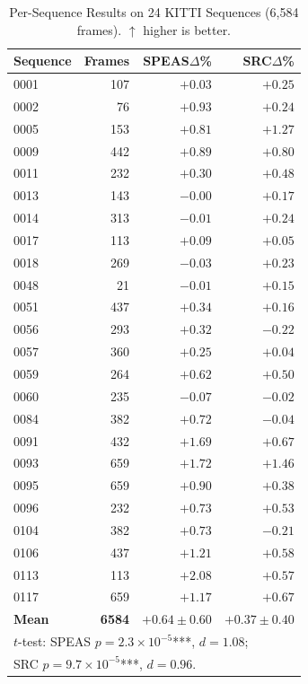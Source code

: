\documentclass[conference]{IEEEtran}
\begin{document}
\begin{table}[t]
\centering
\caption{Per-Sequence Results on 24 KITTI Sequences
(6{,}584 frames). $\uparrow$ higher is better.}
\label{tab:main}
\setlength{\tabcolsep}{4pt}
\begin{tabular}{lrrr}
\toprule
Sequence & Frames & SPEAS$\Delta$\% & SRC$\Delta$\% \\
\midrule
0001 &  107 & $+0.03$ & $+0.25$ \\
0002 &   76 & $+0.93$ & $+0.24$ \\
0005 &  153 & $+0.81$ & $+1.27$ \\
0009 &  442 & $+0.89$ & $+0.80$ \\
0011 &  232 & $+0.30$ & $+0.48$ \\
0013 &  143 & $-0.00$ & $+0.17$ \\
0014 &  313 & $-0.01$ & $+0.24$ \\
0017 &  113 & $+0.09$ & $+0.05$ \\
0018 &  269 & $-0.03$ & $+0.23$ \\
0048 &   21 & $-0.01$ & $+0.15$ \\
0051 &  437 & $+0.34$ & $+0.16$ \\
0056 &  293 & $+0.32$ & $-0.22$ \\
0057 &  360 & $+0.25$ & $+0.04$ \\
0059 &  264 & $+0.62$ & $+0.50$ \\
0060 &  235 & $-0.07$ & $-0.02$ \\
0084 &  382 & $+0.72$ & $-0.04$ \\
0091 &  432 & $+1.69$ & $+0.67$ \\
0093 &  659 & $+1.72$ & $+1.46$ \\
0095 &  659 & $+0.90$ & $+0.38$ \\
0096 &  232 & $+0.73$ & $+0.53$ \\
0104 &  382 & $+0.73$ & $-0.21$ \\
0106 &  437 & $+1.21$ & $+0.58$ \\
0113 &  113 & $+2.08$ & $+0.57$ \\
0117 &  659 & $+1.17$ & $+0.67$ \\
\midrule
\textbf{Mean} & \textbf{6584} &
  $\mathbf{+0.64{\pm}0.60}$ & $\mathbf{+0.37{\pm}0.40}$ \\
\bottomrule
\multicolumn{4}{l}{\footnotesize $t$-test: SPEAS
  $p{=}2.3{\times}10^{-5}${***}, $d{=}1.08$;} \\
\multicolumn{4}{l}{\footnotesize SRC
  $p{=}9.7{\times}10^{-5}${***}, $d{=}0.96$.} \\
\end{tabular}
\end{table}
\end{document}
